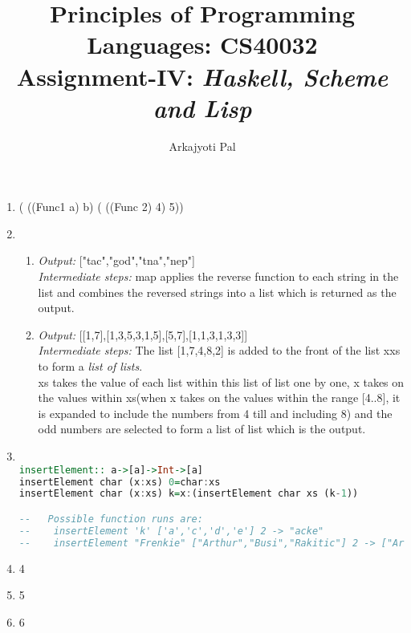 \documentclass[11pt]{article}
\begin{document}
\author{Arkajyoti Pal}
\title{Principles of Programming Languages: CS40032 \\ Assignment-IV: \textit{Haskell, Scheme and Lisp}}
\maketitle

\medskip


\begin{enumerate}
\item 
( ((Func1 a) b) ( ((Func 2) 4) 5))

\item 
\begin{enumerate}
    \item \textit{Output:} {["tac","god","tna","nep"]}\\
           \textit{Intermediate steps:} map applies the reverse function to each string in the list and combines the reversed strings into a list which is returned as the output.
    \item \textit{Output:} {[[1,7],[1,3,5,3,1,5],[5,7],[1,1,3,1,3,3]]}\\
          \textit{Intermediate steps:} The list  {[1,7,4,8,2]} is added to the front of the list xxs to form a \textit{list of lists}.\\
          xs takes the value of each list within this list of list one by one, x takes on the values within xs(when x takes on the values within the range {[4..8]}, it is expanded to include the numbers from 4 till and including 8) and the odd numbers are selected to form a list of list which is the output.
\end{enumerate}
\item
\begin{lstlisting}[language=Haskell,numbers=none]

insertElement:: a->[a]->Int->[a]
insertElement char (x:xs) 0=char:xs
insertElement char (x:xs) k=x:(insertElement char xs (k-1))

--   Possible function runs are:
--    insertElement 'k' ['a','c','d','e'] 2 -> "acke"
--    insertElement "Frenkie" ["Arthur","Busi","Rakitic"] 2 -> ["Arthur","Busi","Frenkie"]
\end{lstlisting} 
\item 4
\item 5
\item 6


\end{enumerate}
\end{document}
